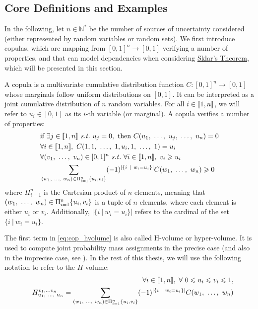 \subsection{Core Definitions and Examples}\label{sec:copula_def}
In the following, let $n\in\mathbb{N}^*$ be the number of sources of uncertainty considered (either represented by random variables or random sets). We first introduce copulas, which are mapping from $[0,1]^n\rightarrow [0,1]$ verifying a number of properties, and that can model dependencies when considering \hyperref[theorem:sklar]{Sklar's Theorem}, which will be presented in this section.

\begin{definition}
     A copula is a multivariate cumulative distribution function $C:[0,1]^{n}\rightarrow [0,1]$ whose marginals follow uniform distributions on $[0,1]$. It can be interpreted as a joint cumulative distribution of $n$ random variables. For all $i\in[\![ 1,n]\!] $, we will refer to $u_i\in[0,1]$ as its $i$-th variable (or marginal). A copula verifies a number of properties:
\begin{align}
    &\text{if }\exists j\in\opi 1,n\cli  \text{ \st }~u_j=0, \text{ then }C(u_1\enum u_j\enum u_n)=0\label{eq:zero_copula}\\
    &\forall i\in\opi 1,n\cli ,~C(1,1\enum1,u_i,1\enum1)=u_i\label{eq:copula_ones}\\
    &\forall (v_1\enum v_n)\in[0,1]^n \text{ \st }~\forall i\in\opi 1,n\cli ,~v_i\geqslant u_i\nonumber\\
    &\sum_{(w_1\enum w_n)\in\Pi_{i=1}^n\{u_i, v_i\}}(-1)^{|\{i~|~w_i=u_i\}|}C(w_1\enum w_n)\geqslant 0\label{eq:cop_hvolume}
\end{align}
where $\Pi_{i=1}^n$ is the Cartesian product of $n$ elements, meaning that $(w_1, ~\dots, ~ w_n)\in\Pi_{i=1}^n\{u_i, v_i\}$ is a tuple of $n$ elements, where each element is either $u_i$ or $v_i$. Additionally, $|\{i~|~w_i=u_i\}|$ refers to the cardinal of the set $\{i~|~w_i=u_i\}$. 
\end{definition}

The first term in \cref{eq:cop_hvolume} is also called H-volume or hyper-volume. It is used to compute joint probability mass assignments in the precise case (and also in the imprecise case, see ). In the rest of this thesis, we will use the following notation to refer to the $H$-volume:
\begin{eqnarray}\label{eq:hvolume}
    &&\forall i\in[\![ 1,n]\!] ,~\forall~0\leqslant u_i \leqslant v_i \leqslant 1,\nonumber\\
    &&H^{v_1,\dots v_n}_{u_1, ~\dots, ~ u_n}=\sum_{(w_1, ~\dots, ~ w_n)\in\Pi_{i=1}^n\{u_i, v_i\}}(-1)^{|\{i~|~w_i=u_i\}|}C(w_1, ~\dots, ~ w_n)
\end{eqnarray}


